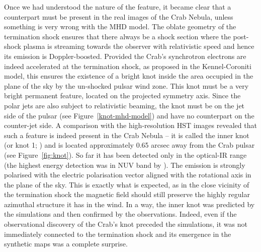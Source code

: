 Once we had understood the nature of the feature, it became clear that a counterpart must be present in the real images of the Crab Nebula, unless something is very wrong with the MHD model. The oblate geometry of the termination shock ensures that there always be a shock section where the post-shock plasma is streaming towards the observer with relativistic speed and hence its emission is Doppler-boosted.   Provided the Crab’s synchrotron electrons are indeed accelerated at the termination shock, as proposed in the Kennel-Coroniti model, this ensures the existence of a bright knot inside the area occupied in the plane of the sky by the un-shocked pulsar wind zone.  This knot must be a very bright permanent feature, located on the projected symmetry axis. Since the polar jets are also subject to relativistic beaming, the knot must be on the jet side of the pulsar (see Figure~\ref{knot-mhd-model}) and have no counterpart on the counter-jet side.      
A comparison with the high-resolution HST images revealed that such a feature is indeed present  in the Crab Nebula --
it is called the inner knot (or knot 1; \citet{hester-95}) and is located approximately 0.65 arcsec away from the Crab pulsar (see Figure~\ref{fig:knot}).  
So far it has been detected only in the optical-IR range (the highest energy detection was in NUV band by \citet{Melatos_2005}).  The emission is strongly polarised with the electric polarisation vector aligned with the rotational axis in the plane of the sky. This is exactly what is expected, as in the close vicinity of the termination shock the magnetic field should still preserve the highly regular azimuthal structure it has in the wind.  In a way, the inner knot was predicted by the simulations and then confirmed by the observations. Indeed, even if the observational discovery of the Crab's knot  preceded  the simulations, it was not immediately connected to the termination shock and its emergence in the synthetic maps was a complete surprise.      